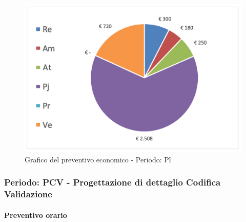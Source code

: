 							\begin{figure}[H]  \centering  \includegraphics[scale=0.40]{img/s_Pl}
									\caption{Grafico del preventivo economico - Periodo: 								Pl	}  \label{fig:s_Pl"} 		\end{figure}
		\newpage
		\subsubsection {Periodo: PCV - Progettazione di dettaglio Codifica Validazione}
		\paragraph{Preventivo orario}

